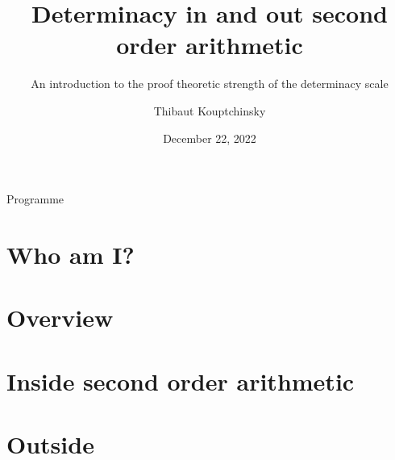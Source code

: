 \documentclass{beamer} %
\title[]{Determinacy in and out second order arithmetic}
\subtitle[]{An introduction to the proof theoretic strength of the determinacy scale}
\institute[Proof Theory Conference]{}
\author{Thibaut Kouptchinsky}
\date{December 22, 2022}
\begin{document}
\begin{frame}
	\titlepage
\end{frame}


\begin{frame}{Programme}
    \tableofcontents
\end{frame}


\section{Who am I?}

\begin{frame}
    
\end{frame}


%
\section{Overview}

\begin{frame}

\end{frame}


\section{Inside second order arithmetic}

\begin{frame}{}
    
\end{frame}


\section{Outside}

\begin{frame}{}

\end{frame}

\end{document}
